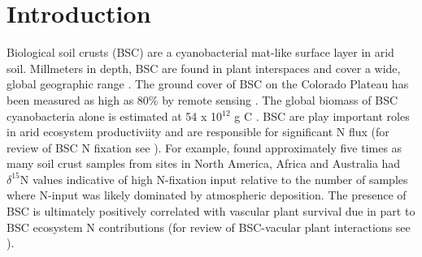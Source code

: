 \section{Introduction}


Biological soil crusts (BSC) are a cyanobacterial mat-like surface layer in arid soil. Millmeters in depth, BSC are found in plant interspaces and cover a wide, global geographic range \cite{garcia2003estimates}. The ground cover of BSC on the Colorado Plateau has been measured as high as 80\% by remote sensing \cite{karnieli2001}. The global biomass of BSC cyanobacteria alone is estimated at 54 x 10$^{12}$ g C \cite{garcia2003estimates}. BSC are play important roles in arid ecosystem productiviity and are responsible for significant N flux (for review of BSC N fixation see \citet{belnap2003}). For example, \citet{Evans_1999} found approximately five times as many soil crust samples from sites in North America, Africa and Australia had $\delta^{15}$N values indicative of high N-fixation input relative to the number of samples where N-input was likely dominated by atmospheric deposition. The presence of BSC is ultimately positively correlated with vascular plant survival due in part to BSC ecosystem N contributions (for review of BSC-vacular plant interactions see \citet{BelnapVascular}).

